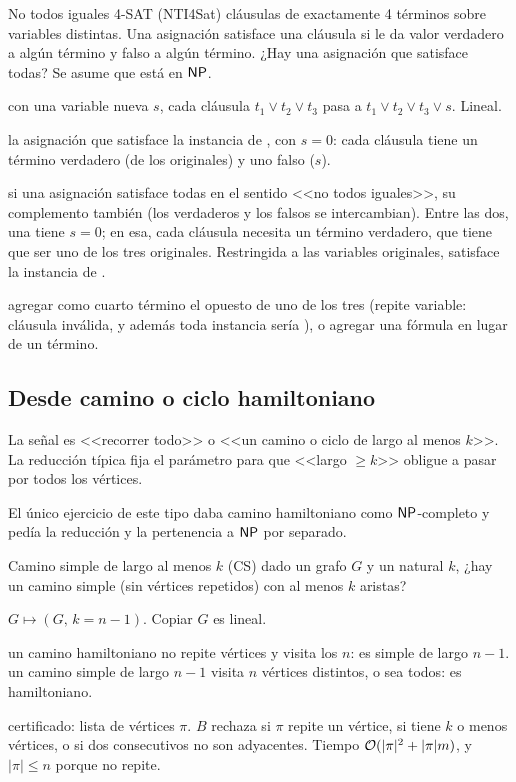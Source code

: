 \begin{problema}{No todos iguales 4-SAT (NTI4Sat)}
 cláusulas de exactamente 4 términos sobre variables distintas. Una asignación satisface una cláusula si le da valor verdadero a algún término y falso a algún término. ¿Hay una asignación que satisface todas? Se asume que está en $\mathsf{NP}$.

 con una variable nueva $s$, cada cláusula $t_1\vee t_2\vee t_3$ pasa a $t_1\vee t_2\vee t_3\vee s$. Lineal.

 la asignación que satisface la instancia de \npTSAT, con $s=0$: cada cláusula tiene un término verdadero (de los originales) y uno falso ($s$).

 si una asignación satisface todas en el sentido <<no todos iguales>>, su complemento también (los verdaderos y los falsos se intercambian). Entre las dos, una tiene $s=0$; en esa, cada cláusula necesita un término verdadero, que tiene que ser uno de los tres originales. Restringida a las variables originales, satisface la instancia de \npTSAT.

 agregar como cuarto término el opuesto de uno de los tres (repite variable: cláusula inválida, y además toda instancia sería \npsi), o agregar una fórmula en lugar de un término.
\end{problema}

\subsection{Desde camino o ciclo hamiltoniano}

La señal es <<recorrer todo>> o <<un camino o ciclo de largo al menos $k$>>. La reducción típica fija el parámetro para que <<largo $\ge k$>> obligue a pasar por todos los vértices.

El único ejercicio de este tipo daba camino hamiltoniano como $\mathsf{NP}$-completo y pedía la reducción y la pertenencia a $\mathsf{NP}$ por separado.

\begin{problema}{Camino simple de largo al menos $k$ (CS)}
 dado un grafo $G$ y un natural $k$, ¿hay un camino simple (sin vértices repetidos) con al menos $k$ aristas?

 $G\mapsto(G,\,k=n-1)$. Copiar $G$ es lineal.

 un camino hamiltoniano no repite vértices y visita los $n$: es simple de largo $n-1$.  un camino simple de largo $n-1$ visita $n$ vértices distintos, o sea todos: es hamiltoniano.

 certificado: lista de vértices $\pi$. $B$ rechaza si $\pi$ repite un vértice, si tiene $k$ o menos vértices, o si dos consecutivos no son adyacentes. Tiempo $\mathcal{O}(|\pi|^2+|\pi|m)$, y $|\pi|\le n$ porque no repite.
\end{problema}

